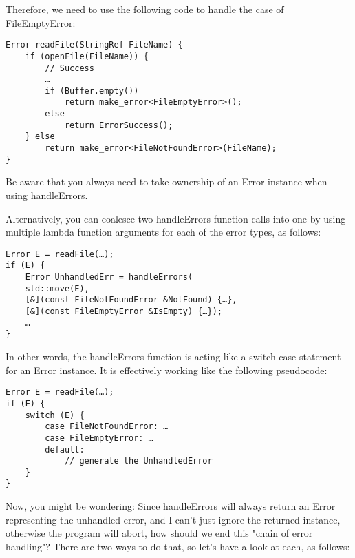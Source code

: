 Therefore, we need to use the following code to handle the case of FileEmptyError:

\begin{lstlisting}[style=styleCXX]
Error readFile(StringRef FileName) {
	if (openFile(FileName)) {
		// Success
		…
		if (Buffer.empty())
			return make_error<FileEmptyError>();
		else
			return ErrorSuccess();
	} else
		return make_error<FileNotFoundError>(FileName);
}
\end{lstlisting}

Be aware that you always need to take ownership of an Error instance when using handleErrors.

Alternatively, you can coalesce two handleErrors function calls into one by using multiple lambda function arguments for each of the error types, as follows:

\begin{lstlisting}[style=styleCXX]
Error E = readFile(…);
if (E) {
	Error UnhandledErr = handleErrors(
	std::move(E),
	[&](const FileNotFoundError &NotFound) {…},
	[&](const FileEmptyError &IsEmpty) {…});
	…
}
\end{lstlisting}

In other words, the handleErrors function is acting like a switch-case statement for an Error instance. It is effectively working like the following pseudocode:

\begin{lstlisting}[style=styleCXX]
Error E = readFile(…);
if (E) {
	switch (E) {
		case FileNotFoundError: …
		case FileEmptyError: …
		default:
			// generate the UnhandledError
	}
}
\end{lstlisting}

Now, you might be wondering: Since handleErrors will always return an Error representing the unhandled error, and I can't just ignore the returned instance, otherwise the program will abort, how should we end this "chain of error handling"? There are two ways to do that, so let's have a look at each, as follows:

